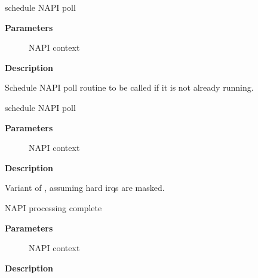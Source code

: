 \documentclass[a4paper,8pt,english]{sphinxmanual}
\begin{document}
\begin{fulllineitems}
\label{networking/kapi:c.napi_schedule}
schedule NAPI poll

\end{fulllineitems}


\textbf{Parameters}
\begin{description}
\item[{}] \leavevmode
NAPI context

\end{description}

\textbf{Description}

Schedule NAPI poll routine to be called if it is not already
running.

\begin{fulllineitems}
\label{networking/kapi:c.napi_schedule_irqoff}
schedule NAPI poll

\end{fulllineitems}


\textbf{Parameters}
\begin{description}
\item[{}] \leavevmode
NAPI context

\end{description}

\textbf{Description}

Variant of {\hyperref[networking/kapi:c.napi_schedule]{\emph{}}}, assuming hard irqs are masked.

\begin{fulllineitems}
\label{networking/kapi:c.napi_complete}
NAPI processing complete

\end{fulllineitems}


\textbf{Parameters}
\begin{description}
\item[{}] \leavevmode
NAPI context

\end{description}

\textbf{Description}
\end{document}
